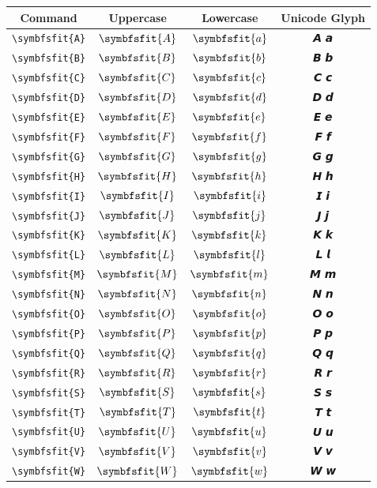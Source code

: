 \documentclass[12pt,a4paper]{article}
\begin{document}
\begin{longtable}{|c|c|c|c|}
\hline
\textbf{Command} & \textbf{Uppercase} & \textbf{Lowercase} & \textbf{Unicode Glyph} \\
\hline
\verb|\symbfsfit{A}| & $\symbfsfit{A}$ & $\symbfsfit{a}$ & 𝘼 𝙖 \\
\verb|\symbfsfit{B}| & $\symbfsfit{B}$ & $\symbfsfit{b}$ & 𝘽 𝙗 \\
\verb|\symbfsfit{C}| & $\symbfsfit{C}$ & $\symbfsfit{c}$ & 𝘾 𝙘 \\
\verb|\symbfsfit{D}| & $\symbfsfit{D}$ & $\symbfsfit{d}$ & 𝘿 𝙙 \\
\verb|\symbfsfit{E}| & $\symbfsfit{E}$ & $\symbfsfit{e}$ & 𝙀 𝙚 \\
\verb|\symbfsfit{F}| & $\symbfsfit{F}$ & $\symbfsfit{f}$ & 𝙁 𝙛 \\
\verb|\symbfsfit{G}| & $\symbfsfit{G}$ & $\symbfsfit{g}$ & 𝙂 𝙜 \\
\verb|\symbfsfit{H}| & $\symbfsfit{H}$ & $\symbfsfit{h}$ & 𝙃 𝙝 \\
\verb|\symbfsfit{I}| & $\symbfsfit{I}$ & $\symbfsfit{i}$ & 𝙄 𝙞 \\
\verb|\symbfsfit{J}| & $\symbfsfit{J}$ & $\symbfsfit{j}$ & 𝙅 𝙟 \\
\verb|\symbfsfit{K}| & $\symbfsfit{K}$ & $\symbfsfit{k}$ & 𝙆 𝙠 \\
\verb|\symbfsfit{L}| & $\symbfsfit{L}$ & $\symbfsfit{l}$ & 𝙇 𝙡 \\
\verb|\symbfsfit{M}| & $\symbfsfit{M}$ & $\symbfsfit{m}$ & 𝙈 𝙢 \\
\verb|\symbfsfit{N}| & $\symbfsfit{N}$ & $\symbfsfit{n}$ & 𝙉 𝙣 \\
\verb|\symbfsfit{O}| & $\symbfsfit{O}$ & $\symbfsfit{o}$ & 𝙊 𝙤 \\
\verb|\symbfsfit{P}| & $\symbfsfit{P}$ & $\symbfsfit{p}$ & 𝙋 𝙥 \\
\verb|\symbfsfit{Q}| & $\symbfsfit{Q}$ & $\symbfsfit{q}$ & 𝙌 𝙦 \\
\verb|\symbfsfit{R}| & $\symbfsfit{R}$ & $\symbfsfit{r}$ & 𝙍 𝙧 \\
\verb|\symbfsfit{S}| & $\symbfsfit{S}$ & $\symbfsfit{s}$ & 𝙎 𝙨 \\
\verb|\symbfsfit{T}| & $\symbfsfit{T}$ & $\symbfsfit{t}$ & 𝙏 𝙩 \\
\verb|\symbfsfit{U}| & $\symbfsfit{U}$ & $\symbfsfit{u}$ & 𝙐 𝙪 \\
\verb|\symbfsfit{V}| & $\symbfsfit{V}$ & $\symbfsfit{v}$ & 𝙑 𝙫 \\
\verb|\symbfsfit{W}| & $\symbfsfit{W}$ & $\symbfsfit{w}$ & 𝙒 𝙬 \\

\end{longtable}
\end{document}
